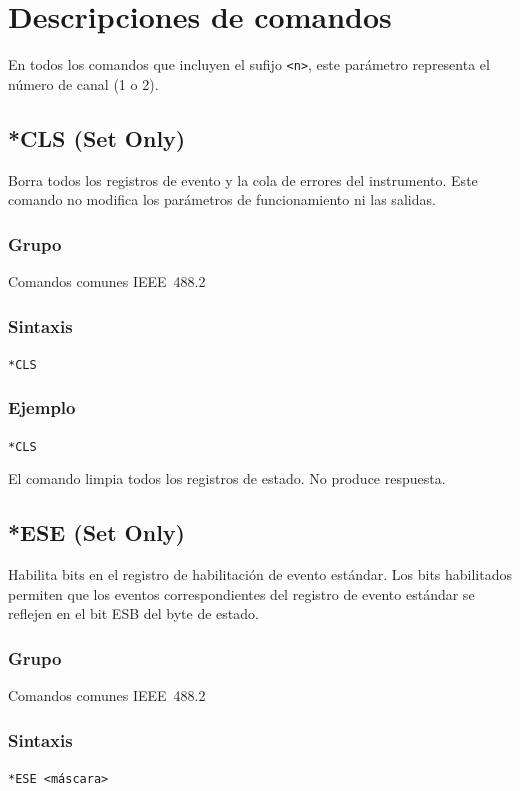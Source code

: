 \section{Descripciones de comandos}
\label{sec:cmd-desc}

En todos los comandos que incluyen el sufijo \texttt{<n>}, este parámetro
representa el número de canal (1 o 2).

\subsection*{*CLS (Set Only)}

Borra todos los registros de evento y la cola de errores del instrumento. Este comando no modifica los parámetros de funcionamiento ni las salidas.

\subsubsection*{Grupo}
Comandos comunes IEEE~488.2

\subsubsection*{Sintaxis}
\texttt{*CLS}

\subsubsection*{Ejemplo}
\texttt{*CLS}

El comando limpia todos los registros de estado. No produce respuesta.

\subsection*{*ESE (Set Only)}

Habilita bits en el registro de habilitación de evento estándar. Los bits habilitados permiten que los eventos correspondientes del registro de evento estándar se reflejen en el bit ESB del byte de estado.

\subsubsection*{Grupo}
Comandos comunes IEEE~488.2

\subsubsection*{Sintaxis}
\texttt{*ESE <máscara>}

